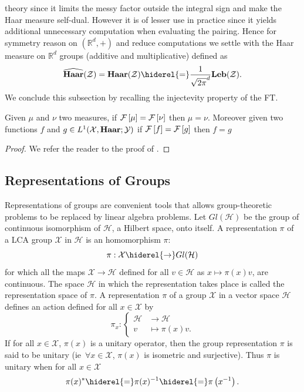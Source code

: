 theory since it limits the messy factor outside the integral sign and make the
Haar measure self-dual. However it is of lesser use in practice since it yields
additional unnecessary computation when evaluating the pairing. Hence for
symmetry reason on $(\mathbb{R}^d, +)$ and reduce computations we settle with
the Haar measure on $\mathbb{R}^d$ groups (additive and multiplicative) defined
as
\begin{dmath*}
    \dual{\Haar}(\mathcal{Z})
    = \Haar(\mathcal{Z})
    \hiderel{=} \frac{1}{\sqrt{2\pi}^d} \Leb(\mathcal{Z}).
\end{dmath*}
We conclude this subsection by recalling the injectevity property of the
\acl{FT}.
\begin{corollary}
    Given $\mu$ and $\nu$ two measures, if $\mathcal{F}\left[\mu\right]=\mathcal{F}\left[\nu\right]$ then $\mu=\nu$.
    Moreover given two functions $f$ and $g\in
    L^1(\mathcal{X},\mathbf{Haar};\mathcal{Y})$ if $\mathcal{F}\left[f\right]=\mathcal{F}\left[g\right]$ then $f=g$
\end{corollary}
\begin{proof}
    We refer the reader to the proof of \citet[corollary~4.34
    page~112]{folland1994course}.
\end{proof}

\subsection{Representations of Groups}
Representations of groups are convenient tools that allows
group\--\-theo\-re\-tic problems to be replaced by linear algebra problems. Let
$Gl(\mathcal{H})$ be the group of continuous isomorphism of $\mathcal{H}$, a
Hilbert space, onto itself. A representation $\pi$ of a \ac{LCA} group
$\mathcal{X}$ in $\mathcal{H}$ is an homomorphism $\pi$:
\begin{dmath*}
    \pi:\mathcal{X}\hiderel{\to} Gl(\mathcal{H})
\end{dmath*}
for which all the maps $\mathcal{X}\to\mathcal{H}$ defined for all
$v\in\mathcal{H}$ as $x\mapsto \pi(x)v$, are continuous. The space
$\mathcal{H}$ in which the representation takes place is called the
representation space of $\pi$. A representation $\pi$ of a group $\mathcal{X}$
in a vector space $\mathcal{H}$ defines an action defined for all
$x\in\mathcal{X}$ by
\begin{dmath*}
    \pi_x:
    \begin{cases}
        \mathcal{H}&\to\mathcal{H} \\
        v &\mapsto \pi(x)v.
    \end{cases}
\end{dmath*}
If for all $x\in\mathcal{X}$, $\pi(x)$ is a unitary operator, then the group
representation $\pi$ is said to be unitary (\acs{ie}~$\forall x\in\mathcal{X}$,
$\pi(x)$ is isometric and surjective). Thus $\pi$ is unitary when for all
$x\in\mathcal{X}$
\begin{dmath*}
    \pi(x)^*\hiderel{=}\pi(x)^{-1}\hiderel{=}\pi\left(x^{-1}\right).
\end{dmath*}
